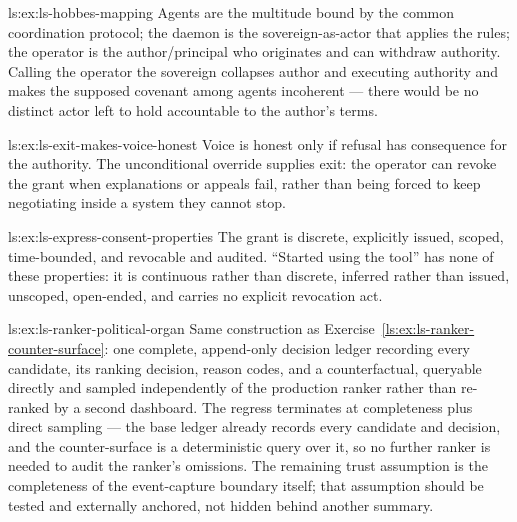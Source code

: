 \begin{pdSolution}{ls:ex:ls-hobbes-mapping}
Agents are the multitude bound by the common coordination protocol; the daemon is the sovereign-as-actor that applies the rules; the operator is the author/principal who originates and can withdraw authority. Calling the operator the sovereign collapses author and executing authority and makes the supposed covenant among agents incoherent --- there would be no distinct actor left to hold accountable to the author's terms.
\end{pdSolution}
\begin{pdSolution}{ls:ex:ls-exit-makes-voice-honest}
Voice is honest only if refusal has consequence for the authority. The unconditional override supplies exit: the operator can revoke the grant when explanations or appeals fail, rather than being forced to keep negotiating inside a system they cannot stop.
\end{pdSolution}
\begin{pdSolution}{ls:ex:ls-express-consent-properties}
The grant is discrete, explicitly issued, scoped, time-bounded, and revocable and audited. ``Started using the tool'' has none of these properties: it is continuous rather than discrete, inferred rather than issued, unscoped, open-ended, and carries no explicit revocation act.
\end{pdSolution}
\begin{pdSolution}{ls:ex:ls-ranker-political-organ}
Same construction as Exercise~\ref{ls:ex:ls-ranker-counter-surface}: one complete, append-only decision ledger recording every candidate, its ranking decision, reason codes, and a counterfactual, queryable directly and sampled independently of the production ranker rather than re-ranked by a second dashboard. The regress terminates at completeness plus direct sampling --- the base ledger already records every candidate and decision, and the counter-surface is a deterministic query over it, so no further ranker is needed to audit the ranker's omissions. The remaining trust assumption is the completeness of the event-capture boundary itself; that assumption should be tested and externally anchored, not hidden behind another summary.
\end{pdSolution}
